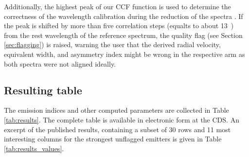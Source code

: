 Additionally, the highest peak of our CCF function is used to determine the correctness of the wavelength calibration during the reduction of the spectra \cite{2017MNRAS.464.1259K}. If the peak is shifted by more than five correlation steps (equalts to about 13~\kms) from the rest wavelength of the reference spectrum, the quality flag (see Section \ref{sec:flagging}) is raised, warning the user that the derived radial velocity, equivalent width, and asymmetry index might be wrong in the respective arm as both spectra were not aligned ideally.

\subsection{Resulting table}
\label{sec:results}
The emission indices and other computed parameters are collected in Table \ref{tab:results}. The complete table is available in electronic form at the CDS. An excerpt of the published results, containing a subset of 30 rows and 11 most interesting columns for the strongest unflagged emitters is given in Table \ref{tab:results_values}.

